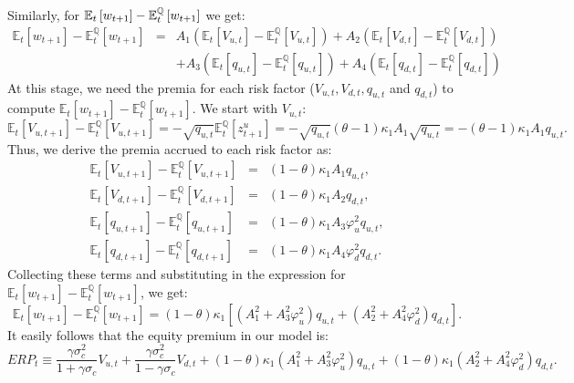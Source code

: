 \documentclass[11pt]{article}
\begin{document}
\begin{small}
Similarly, for $\mathbb{E}_{t}\left[ w_{t+1}\right] -\mathbb{E}_{t}^{\mathbb{%
Q}}\left[ w_{t+1}\right] $ we get:
\begin{eqnarray*}
\mathbb{E}_{t}\left[ w_{t+1}\right] -\mathbb{E}_{t}^{\mathbb{Q}}\left[
w_{t+1}\right] &=&A_{1}\left( \mathbb{E}_{t}\left[ V_{u,t}\right] -\mathbb{E}%
_{t}^{\mathbb{Q}}\left[ V_{u,t}\right] \right) +A_{2}\left( \mathbb{E}_{t}%
\left[ V_{d,t}\right] -\mathbb{E}_{t}^{\mathbb{Q}}\left[ V_{d,t}\right]
\right) \\
&&+A_{3}\left( \mathbb{E}_{t}\left[ q_{u,t}\right] -\mathbb{E}_{t}^{\mathbb{Q%
}}\left[ q_{u,t}\right] \right) +A_{4}\left( \mathbb{E}_{t}\left[ q_{d,t}%
\right] -\mathbb{E}_{t}^{\mathbb{Q}}\left[ q_{d,t}\right] \right)
\end{eqnarray*}%
At this stage, we need the premia for each risk factor ($%
V_{u,t},V_{d,t},q_{u,t}$ and $q_{d,t}$) to compute $\mathbb{E}_{t}\left[
w_{t+1}\right] -\mathbb{E}_{t}^{\mathbb{Q}}\left[ w_{t+1}\right] $. We start
with $V_{u,t}$:
\begin{equation*}
\mathbb{E}_{t}\left[ V_{u,t+1}\right] -\mathbb{E}_{t}^{\mathbb{Q}}\left[
V_{u,t+1}\right] =-\sqrt{q_{u,t}}\mathbb{E}_{t}^{\mathbb{Q}}\left[
z_{t+1}^{u}\right] =-\sqrt{q_{u,t}}(\theta -1)\kappa _{1}A_{1}\sqrt{q_{u,t}}%
=-(\theta -1)\kappa _{1}A_{1}q_{u,t}.
\end{equation*}%
Thus, we derive the premia accrued to each risk factor as:
\begin{eqnarray*}
\mathbb{E}_{t}\left[ V_{u,t+1}\right] -\mathbb{E}_{t}^{\mathbb{Q}}\left[
V_{u,t+1}\right] &=&(1-\theta )\kappa _{1}A_{1}q_{u,t}, \\
\mathbb{E}_{t}\left[ V_{d,t+1}\right] -\mathbb{E}_{t}^{\mathbb{Q}}\left[
V_{d,t+1}\right] &=&(1-\theta )\kappa _{1}A_{2}q_{d,t}, \\
\mathbb{E}_{t}\left[ q_{u,t+1}\right] -\mathbb{E}_{t}^{\mathbb{Q}}\left[
q_{u,t+1}\right] &=&(1-\theta )\kappa _{1}A_{3}\varphi _{u}^{2}q_{u,t}, \\
\mathbb{E}_{t}\left[ q_{d,t+1}\right] -\mathbb{E}_{t}^{\mathbb{Q}}\left[
q_{d,t+1}\right] &=&(1-\theta )\kappa _{1}A_{4}\varphi _{d}^{2}q_{d,t}.
\end{eqnarray*}%
Collecting these terms and substituting in the expression for $\mathbb{E}_{t}%
\left[ w_{t+1}\right] -\mathbb{E}_{t}^{\mathbb{Q}}\left[ w_{t+1}\right] $,
we get:%
\begin{equation*}
\mathbb{E}_{t}\left[ w_{t+1}\right] -\mathbb{E}_{t}^{\mathbb{Q}}\left[
w_{t+1}\right] =(1-\theta )\kappa _{1}\left[ \left(
A_{1}^{2}+A_{3}^{2}\varphi _{u}^{2}\right) q_{u,t}+\left(
A_{2}^{2}+A_{4}^{2}\varphi _{d}^{2}\right) q_{d,t}\right] .
\end{equation*}%
It easily follows that the equity premium in our model is:
\begin{equation}
ERP_{t}\equiv \frac{\gamma \sigma _{c}^{2}}{1+\gamma \sigma _{c}}V_{u,t}+%
\frac{\gamma \sigma _{c}^{2}}{1-\gamma \sigma _{c}}V_{d,t}+(1-\theta )\kappa
_{1}\left( A_{1}^{2}+A_{3}^{2}\varphi _{u}^{2}\right) q_{u,t}+(1-\theta
)\kappa _{1}\left( A_{2}^{2}+A_{4}^{2}\varphi _{d}^{2}\right) q_{d,t}.
\label{EqEqPremFinal}
\end{equation}%


\end{small}
\end{document}
